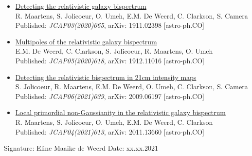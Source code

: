 {\begin{itemize}
	Published: \textit{MNRAS Letters 486 (2019) L101},	arXiv: 1812.09512 [astro-ph.CO]
	\item \underline{Detecting the relativistic galaxy bispectrum} \\
	R. Maartens, S. Jolicoeur, O. Umeh, E.M. De Weerd, C. Clarkson, S. Camera\\
	Published: \textit{JCAP03(2020)065},	arXiv: 1911.02398 [astro-ph.CO]
	\item \underline{Multipoles of the relativistic galaxy bispectrum} \\
	E.M. De Weerd, C. Clarkson, S. Jolicoeur, R. Maartens, O. Umeh \\
	Published: \textit{JCAP05(2020)018},	arXiv: 1912.11016 [astro-ph.CO]
	\item \underline{Detecting the relativistic bispectrum in 21cm intensity maps} \\
	S. Jolicoeur, R. Maartens, E.M. De Weerd, O. Umeh, C. Clarkson, S. Camera \\
	Published: \textit{JCAP06(2021)039},	arXiv: 2009.06197 [astro-ph.CO]
	\item \underline{Local primordial non-Gaussianity in the relativistic galaxy bispectrum} \\
	R. Maartens, S. Jolicoeur, O. Umeh, E.M. De Weerd, C. Clarkson \\
	Published: \textit{JCAP04(2021)013},	arXiv: 2011.13660 [astro-ph.CO]
\end{itemize}
\vfill
\noindent Signature: Eline Maaike de Weerd
\newline
Date: xx.xx.2021}
\thispagestyle{empty}


\maketitle
